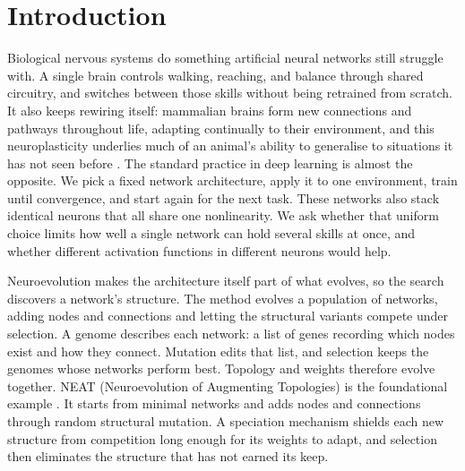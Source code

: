 \documentclass[12pt]{article}
\begin{document}
\bigskip

\newpage

\newpage

\section{Introduction}
\label{sec:introduction}

Biological nervous systems do something artificial neural networks still struggle with.
A single brain controls walking, reaching, and balance through shared circuitry, and switches between those skills without being retrained from scratch.
It also keeps rewiring itself: mammalian brains form new connections and pathways throughout life, adapting continually to their environment, and this neuroplasticity underlies much of an animal's ability to generalise to situations it has not seen before \parencite{pascual-leone_plastic_2005}.
The standard practice in deep learning is almost the opposite.
We pick a fixed network architecture, apply it to one environment, train until convergence, and start again for the next task.
These networks also stack identical neurons that all share one nonlinearity.
We ask whether that uniform choice limits how well a single network can hold several skills at once, and whether different activation functions in different neurons would help.

Neuroevolution makes the architecture itself part of what evolves, so the search discovers a network's structure.
The method evolves a population of networks, adding nodes and connections and letting the structural variants compete under selection.
A genome describes each network: a list of genes recording which nodes exist and how they connect.
Mutation edits that list, and selection keeps the genomes whose networks perform best.
Topology and weights therefore evolve together.
NEAT (Neuroevolution of Augmenting Topologies) is the foundational example \parencite{stanley_evolving_2002}.
It starts from minimal networks and adds nodes and connections through random structural mutation. A speciation mechanism shields each new structure from competition long enough for its weights to adapt, and selection then eliminates the structure that has not earned its keep.
\end{document}
